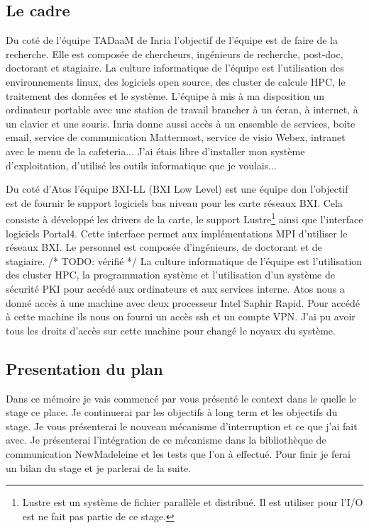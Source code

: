 \subsection{Le cadre}

Du coté de l'équipe TADaaM de Inria l'objectif de l'équipe est de faire de la recherche.
Elle est composée de chercheurs, ingénieurs de recherche, post-doc, doctorant et stagiaire.
La culture informatique de l'équipe est l'utilisation des environnements linux, des logiciels open source,
des cluster de calcule HPC, le traitement des données et le système.
L'équipe à mis à ma disposition un ordinateur portable avec une station de travail brancher à un écran, à internet, à un clavier et une souris.
Inria donne aussi accès à un ensemble de services, boite email, service de communication Mattermost, service de visio Webex, intranet avec le menu de la cafeteria...
J'ai étais libre d'installer mon système d'exploitation, d'utilisé les outils informatique que je voulais...

Du coté d'Atos l'équipe BXI-LL (BXI Low Level) est une équipe don l'objectif est de fournir le support logiciels bas niveau pour les carte réseaux BXI.
Cela consiste à développé les drivers de la carte, le support Lustre\footnote{Lustre est un système de fichier parallèle et distribué. Il est utiliser pour l'I/O est ne fait pas partie de ce stage.} ainsi que l'interface logiciels Portal4.
Cette interface permet aux implémentations MPI d'utiliser le réseaux BXI.
Le personnel est composée d'ingénieurs, de doctorant et de stagiaire. /* TODO: vérifié */
La culture informatique de l'équipe est l'utilisation des cluster HPC, la programmation système et l'utilisation d'un système de sécurité PKI pour accédé aux ordinateurs et aux services interne.
Atos nous a donné accès à une machine avec deux processeur Intel Saphir Rapid.
Pour accédé à cette machine ils nous on fourni un accès ssh et un compte VPN.
J'ai pu avoir tous les droits d'accès sur cette machine pour changé le noyaux du système.

\subsection{Presentation du plan}

Dans ce mémoire je vais commencé par vous présenté le context dans le quelle le stage ce place.
Je continuerai par les objectifs à long term et les objectifs du stage.
Je vous présenterai le nouveau mécanisme d'interruption et ce que j'ai fait avec.
Je présenterai l'intégration de ce mécanisme dans la bibliothèque de communication NewMadeleine et les tests que l'on à effectué.
Pour finir je ferai un bilan du stage et je parlerai de la suite.
